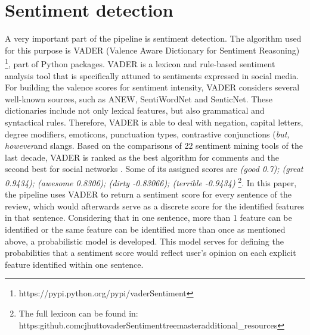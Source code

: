 \section{Sentiment detection}
A very important part of the pipeline is sentiment detection. The algorithm used for this purpose is VADER (Valence Aware Dictionary for Sentiment Reasoning) \footnote{https://pypi.python.org/pypi/vaderSentiment}, part of Python packages. VADER is a lexicon and rule-based sentiment analysis tool that is specifically attuned to sentiments expressed in social media. For building the valence scores for sentiment intensity, VADER considers several well-known sources, such as ANEW, SentiWordNet and SenticNet. These dictionaries include not only lexical features, but also grammatical and syntactical rules.
Therefore, VADER is able to deal with negation, capital letters, degree modifiers, emoticons, punctuation types, contrastive conjunctions (\textit{but, however}and slangs.  Based on the comparisons of 22 sentiment mining tools of the last decade, VADER is ranked as the best algorithm for comments and the second best for social networks \cite{ribeiro2015benchmark}. Some of its assigned scores are \textit{(good 0.7); (great 0.9434); (awesome	0.8306); (dirty -0.83066); (terrible -0.9434)} \footnote{The full lexicon can be found in: https:\/\/github.com\/cjhutto\/vaderSentiment\/tree\/master\/additional\_resources}. In this paper, the pipeline uses VADER to return a sentiment score for every sentence of the review, which would afterwards serve as a discrete score for the identified features in that sentence. Considering that in one sentence, more than 1 feature can be identified or the same feature can be identified more than once as mentioned above, a probabilistic model is developed. This model serves for defining the probabilities that a sentiment score would reflect user's opinion on each explicit feature identified within one sentence. 

